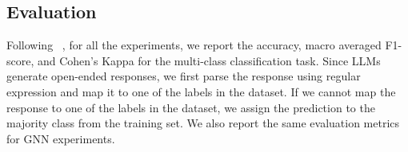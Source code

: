 \subsection{Evaluation}
Following ~\citep{zhang2023emergingdruginteractionprediction}, for all the experiments, we report the accuracy, macro averaged F1-score, and Cohen's Kappa for the multi-class classification task. 
Since LLMs generate open-ended responses, we first parse the response using regular expression and map it to one of the labels in the dataset. 
If we cannot map the response to one of the labels in the dataset, we assign the prediction to the majority class from the training set. 
We also report the same evaluation metrics for GNN experiments. 
